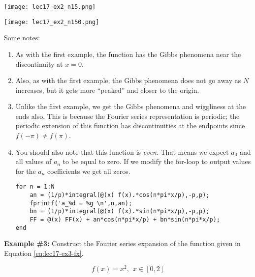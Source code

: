 \begin{marginfigure}
\texttt{[image: lec17\_ex2\_n15.png]}
\caption{Fourier series expansion with \lstinline{N=15}.}
\label{fig:lec17-ex2-n15}
\end{marginfigure}

\begin{marginfigure}
\texttt{[image: lec17\_ex2\_n150.png]}
\caption{Fourier series expansion with \lstinline{N=150}.}
\label{fig:lec17-ex2-n150}
\end{marginfigure}
Some notes:
\begin{enumerate}
\item As with the first example, the function has the Gibbs phenomena near the discontinuity at $x=0$.  
\item Also, as with the first example, the Gibbs phenomena does not go away as $N$ increases, but it gets more ``peaked'' and closer to the origin.
\item Unlike the first example, we get the Gibbs phenomena and wiggliness at the ends also.  This is because the Fourier series representation is periodic; the periodic extension of this function has discontinuities at the endpoints since $f(-\pi) \ne f(\pi)$.  
\item You should also note that this function is \emph{even}.  That means we expect $a_0$ and all values of $a_n$ to be equal to zero. If we modify the for-loop to output values for the $a_n$ coefficients we get all zeros.

\begin{lstlisting}[style=myMatlab]
for n = 1:N
    an = (1/p)*integral(@(x) f(x).*cos(n*pi*x/p),-p,p);
    fprintf('a_%d = %g \n',n,an);
    bn = (1/p)*integral(@(x) f(x).*sin(n*pi*x/p),-p,p);
    FF = @(x) FF(x) + an*cos(n*pi*x/p) + bn*sin(n*pi*x/p); 
end
\end{lstlisting}
\end{enumerate}


\vspace{5.0cm}

\noindent\textbf{Example \#3:} Construct the Fourier series expansion of the function given in Equation \ref{eq:lec17-ex3-fx}.

\begin{equation}
f(x) = x^2, \ \ x \in[0,2]
\label{eq:lec17-ex3-fx}
\end{equation}

